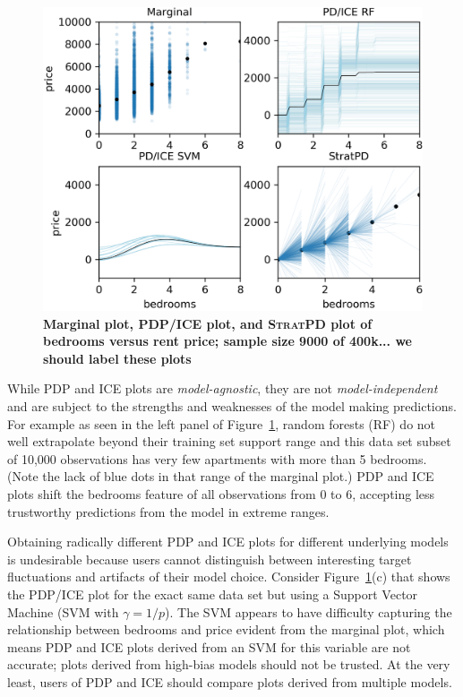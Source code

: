\documentclass[12pt]{article}
\newcommand{\figref}[1]{Figure~\ref{#1}}
\newcommand{\cut}[1]{}
\newcommand{\spd}{\fontfamily{cmr}\textsc{\small StratPD}}
\begin{document}
\begin{figure}[htbp]
\begin{center}
\includegraphics[scale=0.7]{images/bedrooms_vs_price.png}
\caption{{\bf  Marginal plot, PDP/ICE plot, and \spd{} plot of bedrooms versus rent price; sample size 9000 of 400k...{\color{red} we should label these plots}}}
\label{fig:baths_price}
\end{center}
\end{figure}

\cut{The partial dependence plot broadly follows the marginal plot except for the prices of two and three bedrooms apartments, where it levels off. This is counterintuitive and exposes an issue with PD and ICE plots.} While PDP and ICE plots are {\em model-agnostic}, they are not {\em model-independent} and are subject to the strengths and weaknesses of the model making predictions. For example as seen in the left panel of \figref{fig:baths_price}, random forests (RF) do not well extrapolate beyond their training set support range and this data set subset of 10,000 observations has very few apartments with more than 5 bedrooms. (Note the lack of blue dots in that range of the marginal plot.) PDP and ICE plots shift the bedrooms feature of all observations from 0 to 6, accepting less trustworthy predictions from the model in extreme ranges.   

Obtaining radically different PDP and ICE plots for different underlying models is undesirable because users cannot distinguish between interesting target fluctuations and artifacts of their model choice. Consider \figref{fig:baths_price}(c) that shows the PDP/ICE plot for the exact same data set but using a Support Vector Machine (SVM with $\gamma=1/p$). The SVM appears to have difficulty capturing the relationship between bedrooms and price evident from the marginal plot, which means PDP and ICE plots derived from an SVM for this variable are not accurate; plots derived from high-bias models should not be trusted. At the very least, users of PDP and ICE should compare plots derived from multiple models. 
\end{document}
